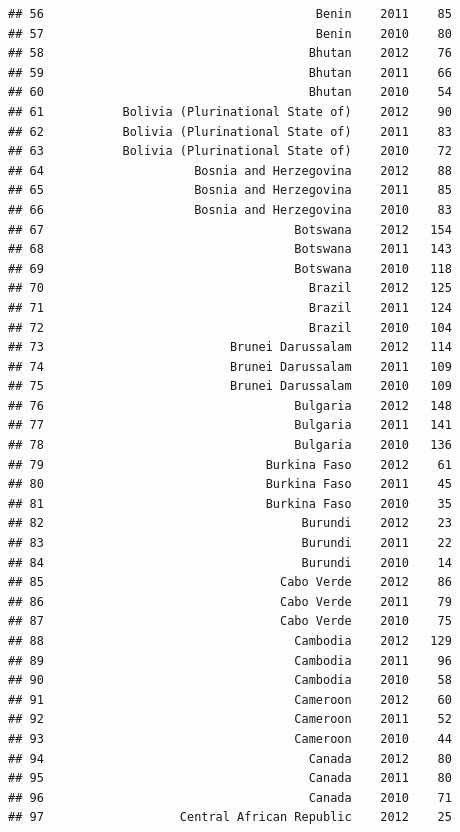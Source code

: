 \documentclass[
]{book}
\begin{document}
\begin{verbatim}
## 56                                      Benin    2011    85
## 57                                      Benin    2010    80
## 58                                     Bhutan    2012    76
## 59                                     Bhutan    2011    66
## 60                                     Bhutan    2010    54
## 61           Bolivia (Plurinational State of)    2012    90
## 62           Bolivia (Plurinational State of)    2011    83
## 63           Bolivia (Plurinational State of)    2010    72
## 64                     Bosnia and Herzegovina    2012    88
## 65                     Bosnia and Herzegovina    2011    85
## 66                     Bosnia and Herzegovina    2010    83
## 67                                   Botswana    2012   154
## 68                                   Botswana    2011   143
## 69                                   Botswana    2010   118
## 70                                     Brazil    2012   125
## 71                                     Brazil    2011   124
## 72                                     Brazil    2010   104
## 73                          Brunei Darussalam    2012   114
## 74                          Brunei Darussalam    2011   109
## 75                          Brunei Darussalam    2010   109
## 76                                   Bulgaria    2012   148
## 77                                   Bulgaria    2011   141
## 78                                   Bulgaria    2010   136
## 79                               Burkina Faso    2012    61
## 80                               Burkina Faso    2011    45
## 81                               Burkina Faso    2010    35
## 82                                    Burundi    2012    23
## 83                                    Burundi    2011    22
## 84                                    Burundi    2010    14
## 85                                 Cabo Verde    2012    86
## 86                                 Cabo Verde    2011    79
## 87                                 Cabo Verde    2010    75
## 88                                   Cambodia    2012   129
## 89                                   Cambodia    2011    96
## 90                                   Cambodia    2010    58
## 91                                   Cameroon    2012    60
## 92                                   Cameroon    2011    52
## 93                                   Cameroon    2010    44
## 94                                     Canada    2012    80
## 95                                     Canada    2011    80
## 96                                     Canada    2010    71
## 97                   Central African Republic    2012    25

\end{verbatim}
\end{document}
